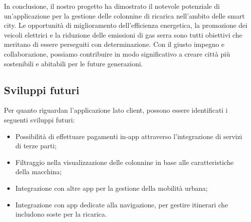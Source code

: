 In conclusione, il nostro progetto ha dimostrato il notevole potenziale di un'applicazione per
la gestione delle colonnine di ricarica nell'ambito delle smart city. Le opportunità di
miglioramento dell'efficienza energetica, la promozione dei veicoli elettrici e la riduzione
delle emissioni di gas serra sono tutti obiettivi che meritano di essere perseguiti con
determinazione. Con il giusto impegno e collaborazione, possiamo contribuire in modo
significativo a creare città più sostenibili e abitabili per le future generazioni.

\subsection{Sviluppi futuri}

Per quanto riguardan l'applicazione lato client, possono essere identificati i seguenti sviluppi futuri:

\begin{itemize}
    \item Possibilità di effettuare pagamenti in-app attraverso l'integrazione di servizi di terze parti;
    \item Filtraggio nella visualizzazione delle colonnine in base alle caratteristiche della macchina;
    \item Integrazione con altre app per la gestione della mobilità urbana;
    \item Integrazione con app dedicate alla navigazione, per gestire itinerari che includono soste per la ricarica.
\end{itemize}

\newpage